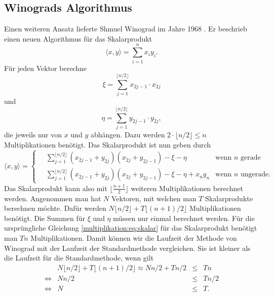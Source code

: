 \subsection{Winograds Algorithmus}
%
%
Einen weiteren Ansatz lieferte Shmuel Winograd im Jahre 1968 \cite{multiplikation:winograd_1968}.
%
Er beschrieb einen neuen Algorithmus f\"ur das Skalarprodukt
\begin{equation} \label{multiplikation:eq:skalar}
	\langle x,y \rangle = \sum_{i=1}^{n}x_i y_i.
\end{equation}
F\"ur jeden Vektor berechne
\begin{equation}
	\xi = \sum_{j=1}^{ \lfloor n/2 \rfloor} x_{2j-1} \cdot x_{2j}
\end{equation}
und
\begin{equation}
	\eta = \sum_{j=1}^{ \lfloor n/2 \rfloor} y_{2j-1} \cdot y_{2j},
\end{equation}
die jeweils nur von $x$ und $y$ abhängen.
Dazu werden $2 \cdot  \lfloor n/2 \rfloor \leq n$ Multiplikationen benötigt.
Das Skalarprodukt ist nun geben durch
\begin{equation}
	\langle x,y \rangle =
	\begin{cases}
	 \displaystyle \quad \sum_{j=1}^{ \lfloor n/2 \rfloor} (x_{2j-1} + y_{2j})(x_{2j}+y_{2j-1})-\xi - \eta & \text{wenn  $n$ gerade}\\
	\displaystyle  \quad \sum_{j=1}^{ \lfloor n/2 \rfloor} (x_{2j-1} + y_{2j})(x_{2j}+y_{2j-1})-\xi - \eta + x_n y_n & \text{wenn  $n$ ungerade}.
	\end{cases}
\end{equation}
Das Skalarprodukt kann also mit $ \lfloor \frac{n+1}{2} \rfloor$ weiteren Multiplikationen berechnet werden.
Angenommen man hat $N$ Vektoren, mit welchen man $T$ Skalarprodukte berechnen m\"ochte.
Daf\"ur werden $N\lfloor n/2 \rfloor + T\lfloor (n+1)/2 \rfloor $ Multiplikationen ben\"otigt.
Die Summen f\"ur $\xi$ und $\eta$ m\"ussen nur einmal berechnet werden.
Für die ursprüngliche Gleichung \eqref{multiplikation:eq:skalar} für das Skalarprodukt benötigt man $Tn$ Multiplikationen.
Damit können wir die Laufzeit der Methode von Winograd mit der Laufzeit der Standardmethode vergleichen. Sie ist kleiner als die Laufzeit für die Standardmethode, wenn gilt
\begin{equation}\label{multiplikation:eq:eff}
\begin{array}{crcl}
                & N\lfloor n/2\rfloor + T\lfloor(n+1)/2\rfloor \approx Nn/2 + Tn/2 & \le & Tn   \\
\Leftrightarrow &                                                             Nn/2 & \le & Tn/2 \\
\Leftrightarrow &                                                                N & \le & T.
\end{array}
\end{equation}
